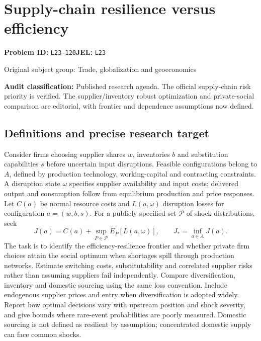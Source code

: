 \documentclass[11pt,a4paper]{article}
\begin{document}
\section*{Supply-chain resilience versus efficiency}
\textbf{Problem ID:} \texttt{L23-120}\quad \textbf{JEL:} \texttt{L23}\par
\label{problem:OP-0345}
\label{audited:ECON-080}
{\sffamily\small\color{muted}Original subject group: Trade, globalization and geoeconomics\par}
\label{definitions:problem:30007627}
\textbf{Audit classification:} Published research agenda. The official supply-chain risk priority is verified. The supplier/inventory robust optimization and private-social comparison are editorial, with frontier and dependence assumptions now defined.
\subsection*{Definitions and precise research target}
Consider firms choosing supplier shares \(w\), inventories \(b\) and substitution capabilities \(s\) before uncertain input disruptions. Feasible configurations belong to \(A\), defined by production technology, working-capital and contracting constraints. A disruption state \(\omega\) specifies supplier availability and input costs; delivered output and consumption follow from equilibrium production and price responses. Let \(C(a)\) be normal resource costs and \(L(a,\omega)\) disruption losses for configuration \(a=(w,b,s)\). For a publicly specified set \(\mathcal P\) of shock distributions, seek
\[J(a)=C(a)+\sup_{P\in\mathcal P}E_P[L(a,\omega)],\qquad J_*=\inf_{a\in A}J(a).\]
The task is to identify the efficiency-resilience frontier and whether private firm choices attain the social optimum when shortages spill through production networks. Estimate switching costs, substitutability and correlated supplier risks rather than assuming suppliers fail independently. Compare diversification, inventory and domestic sourcing using the same loss convention. Include endogenous supplier prices and entry when diversification is adopted widely. Report how optimal decisions vary with upstream position and shock severity, and give bounds where rare-event probabilities are poorly measured. Domestic sourcing is not defined as resilient by assumption; concentrated domestic supply can face common shocks.
\end{document}

